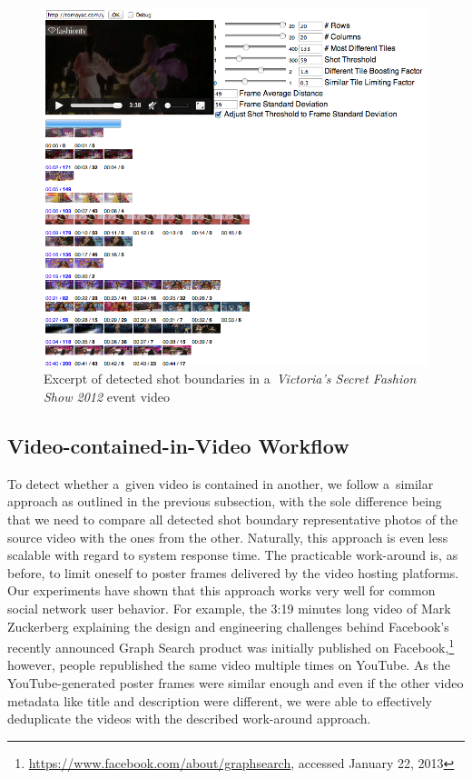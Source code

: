 \begin{figure}[!ht]
  \centering
  \includegraphics[width=1.0\linewidth]{./vsfashionshowboundaries.png}
  \caption[Excerpt of detected shot boundaries in an event video]
  {Excerpt of detected shot boundaries in a~\emph{Victoria's Secret Fashion Show 2012} event video}
  \label{fig:vsfashionshowboundaries}
\end{figure}

\subsection{Video-contained-in-Video Workflow}

To detect whether a~given video is contained in another,
we follow a~similar approach as outlined in the previous subsection,
with the sole difference being that we need to compare
all detected shot boundary representative photos of the source video
with the ones from the other.
Naturally, this approach is even less scalable
with regard to system response time.
The practicable work-around is, as before, to limit oneself
to poster frames delivered by the video hosting platforms.
Our experiments have shown that this approach works very well
for common social network user behavior.
For example, the 3:19 minutes long video of Mark Zuckerberg explaining
the design and engineering challenges behind Facebook's
recently announced Graph Search product was initially published
on Facebook,\footnote{\url{https://www.facebook.com/about/graphsearch},
accessed January 22, 2013} however, people republished the same video 
multiple times on YouTube.
As the YouTube-generated poster frames were similar enough
and even if the other video metadata like title and description
were different, we were able to effectively deduplicate the videos
with the described work-around approach.

